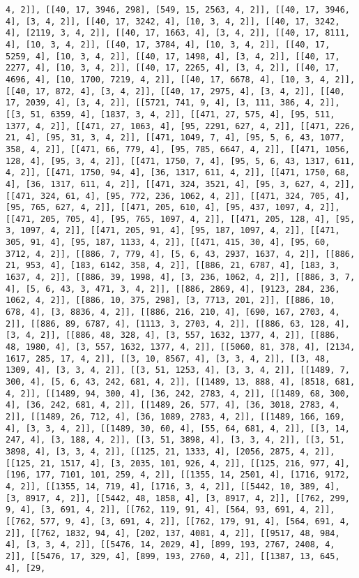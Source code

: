\documentclass[12pt,fleqn]{article}\usepackage{../../common}
\begin{document}
\begin{verbatim}
4, 2]], [[40, 17, 3946, 298], [549, 15, 2563, 4, 2]], [[40, 17, 3946, 4], [3, 4, 2]], [[40, 17, 3242, 4], [10, 3, 4, 2]], [[40, 17, 3242, 4], [2119, 3, 4, 2]], [[40, 17, 1663, 4], [3, 4, 2]], [[40, 17, 8111, 4], [10, 3, 4, 2]], [[40, 17, 3784, 4], [10, 3, 4, 2]], [[40, 17, 5259, 4], [10, 3, 4, 2]], [[40, 17, 1498, 4], [3, 4, 2]], [[40, 17, 2277, 4], [10, 3, 4, 2]], [[40, 17, 2265, 4], [3, 4, 2]], [[40, 17, 4696, 4], [10, 1700, 7219, 4, 2]], [[40, 17, 6678, 4], [10, 3, 4, 2]], [[40, 17, 872, 4], [3, 4, 2]], [[40, 17, 2975, 4], [3, 4, 2]], [[40, 17, 2039, 4], [3, 4, 2]], [[5721, 741, 9, 4], [3, 111, 386, 4, 2]], [[3, 51, 6359, 4], [1837, 3, 4, 2]], [[471, 27, 575, 4], [95, 511, 1377, 4, 2]], [[471, 27, 1063, 4], [95, 2291, 627, 4, 2]], [[471, 226, 21, 4], [95, 31, 3, 4, 2]], [[471, 1049, 7, 4], [95, 5, 6, 43, 1077, 358, 4, 2]], [[471, 66, 779, 4], [95, 785, 6647, 4, 2]], [[471, 1056, 128, 4], [95, 3, 4, 2]], [[471, 1750, 7, 4], [95, 5, 6, 43, 1317, 611, 4, 2]], [[471, 1750, 94, 4], [36, 1317, 611, 4, 2]], [[471, 1750, 68, 4], [36, 1317, 611, 4, 2]], [[471, 324, 3521, 4], [95, 3, 627, 4, 2]], [[471, 324, 61, 4], [95, 772, 236, 1062, 4, 2]], [[471, 324, 705, 4], [95, 765, 627, 4, 2]], [[471, 205, 610, 4], [95, 437, 1097, 4, 2]], [[471, 205, 705, 4], [95, 765, 1097, 4, 2]], [[471, 205, 128, 4], [95, 3, 1097, 4, 2]], [[471, 205, 91, 4], [95, 187, 1097, 4, 2]], [[471, 305, 91, 4], [95, 187, 1133, 4, 2]], [[471, 415, 30, 4], [95, 60, 3712, 4, 2]], [[886, 7, 779, 4], [5, 6, 43, 2937, 1637, 4, 2]], [[886, 21, 953, 4], [183, 6142, 358, 4, 2]], [[886, 21, 6787, 4], [183, 3, 1637, 4, 2]], [[886, 39, 1998, 4], [3, 236, 1062, 4, 2]], [[886, 3, 7, 4], [5, 6, 43, 3, 471, 3, 4, 2]], [[886, 2869, 4], [9123, 284, 236, 1062, 4, 2]], [[886, 10, 375, 298], [3, 7713, 201, 2]], [[886, 10, 678, 4], [3, 8836, 4, 2]], [[886, 216, 210, 4], [690, 167, 2703, 4, 2]], [[886, 89, 6787, 4], [1113, 3, 2703, 4, 2]], [[886, 63, 128, 4], [3, 4, 2]], [[886, 48, 328, 4], [3, 557, 1632, 1377, 4, 2]], [[886, 48, 1980, 4], [3, 557, 1632, 1377, 4, 2]], [[5060, 81, 378, 4], [2134, 1617, 285, 17, 4, 2]], [[3, 10, 8567, 4], [3, 3, 4, 2]], [[3, 48, 1309, 4], [3, 3, 4, 2]], [[3, 51, 1253, 4], [3, 3, 4, 2]], [[1489, 7, 300, 4], [5, 6, 43, 242, 681, 4, 2]], [[1489, 13, 888, 4], [8518, 681, 4, 2]], [[1489, 94, 300, 4], [36, 242, 2783, 4, 2]], [[1489, 68, 300, 4], [36, 242, 681, 4, 2]], [[1489, 26, 577, 4], [36, 3018, 2783, 4, 2]], [[1489, 26, 712, 4], [36, 1089, 2783, 4, 2]], [[1489, 166, 169, 4], [3, 3, 4, 2]], [[1489, 30, 60, 4], [55, 64, 681, 4, 2]], [[3, 14, 247, 4], [3, 188, 4, 2]], [[3, 51, 3898, 4], [3, 3, 4, 2]], [[3, 51, 3898, 4], [3, 3, 4, 2]], [[125, 21, 1333, 4], [2056, 2875, 4, 2]], [[125, 21, 1517, 4], [3, 2035, 101, 926, 4, 2]], [[125, 216, 977, 4], [196, 177, 7101, 101, 259, 4, 2]], [[1355, 14, 2501, 4], [1716, 9172, 4, 2]], [[1355, 14, 719, 4], [1716, 3, 4, 2]], [[5442, 10, 389, 4], [3, 8917, 4, 2]], [[5442, 48, 1858, 4], [3, 8917, 4, 2]], [[762, 299, 9, 4], [3, 691, 4, 2]], [[762, 119, 91, 4], [564, 93, 691, 4, 2]], [[762, 577, 9, 4], [3, 691, 4, 2]], [[762, 179, 91, 4], [564, 691, 4, 2]], [[762, 1832, 94, 4], [202, 137, 4081, 4, 2]], [[9517, 48, 984, 4], [3, 3, 4, 2]], [[5476, 14, 2029, 4], [899, 193, 2767, 2408, 4, 2]], [[5476, 17, 329, 4], [899, 193, 2760, 4, 2]], [[1387, 13, 645, 4], [29, 
\end{verbatim}
\end{document}
